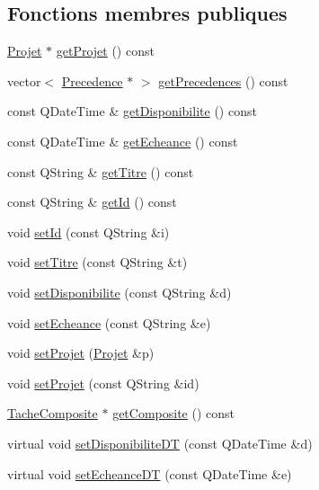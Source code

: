 \subsection*{Fonctions membres publiques}
\begin{DoxyCompactItemize}
\item 
\hyperlink{class_projet}{Projet} $\ast$ \hyperlink{class_tache_ab625a7bde0e9ef9cbb8bb07696cdd985}{get\+Projet} () const 
\item 
vector$<$ \hyperlink{class_precedence}{Precedence} $\ast$ $>$ \hyperlink{class_tache_a663555dc2753ade57ceb7b3407e01fca}{get\+Precedences} () const 
\item 
const Q\+Date\+Time \& \hyperlink{class_tache_af01274a0f287d4598c611e65ff560509}{get\+Disponibilite} () const 
\item 
const Q\+Date\+Time \& \hyperlink{class_tache_a31bc22c34f6f3630192009245347da71}{get\+Echeance} () const 
\item 
const Q\+String \& \hyperlink{class_tache_a1f9ccf770c1873bbaa1c63aba11c198e}{get\+Titre} () const 
\item 
const Q\+String \& \hyperlink{class_tache_ab8354f8832fb8f1ed8e911c53f9ecb51}{get\+Id} () const 
\item 
void \hyperlink{class_tache_ab86e1a897f1da92bedad09af497a4076}{set\+Id} (const Q\+String \&i)
\item 
void \hyperlink{class_tache_afade5c5180edea94d258da777b2006df}{set\+Titre} (const Q\+String \&t)
\item 
void \hyperlink{class_tache_a3ee16d4ce77af8bae5ceea485d4fce79}{set\+Disponibilite} (const Q\+String \&d)
\item 
void \hyperlink{class_tache_a1d06b03ee9f2c60ef43ffb8fc7cacdba}{set\+Echeance} (const Q\+String \&e)
\item 
void \hyperlink{class_tache_ad48e1f420a9acdb88d05fab52ddcc402}{set\+Projet} (\hyperlink{class_projet}{Projet} \&p)
\item 
void \hyperlink{class_tache_aaceff1bb035b504fdcc06401515b66d8}{set\+Projet} (const Q\+String \&id)
\item 
\hyperlink{class_tache_composite}{Tache\+Composite} $\ast$ \hyperlink{class_tache_a69fe54e6a7551244a18101764256c3cd}{get\+Composite} () const 
\item 
virtual void \hyperlink{class_tache_a5f22769fadb598764c937d65a901946f}{set\+Disponibilite\+D\+T} (const Q\+Date\+Time \&d)
\item 
\hypertarget{class_tache_add128bd3a8b4832f4e6f52e0ee80e16b}{}virtual void \hyperlink{class_tache_add128bd3a8b4832f4e6f52e0ee80e16b}{set\+Echeance\+D\+T} (const Q\+Date\+Time \&e)\label{class_tache_add128bd3a8b4832f4e6f52e0ee80e16b}


\end{DoxyCompactItemize}
